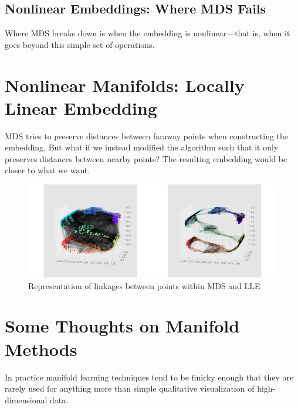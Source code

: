 \subsection{Nonlinear Embeddings: Where MDS Fails}
Where MDS breaks down is when the embedding is nonlinear—that is, when it goes beyond this simple set of operations.

\section{Nonlinear Manifolds: Locally Linear Embedding}
MDS tries to preserve distances between faraway points when constructing the embedding. But what if we instead modified the algorithm such that it
only preserves distances between nearby points? The resulting embedding would be
closer to what we want.

\begin{figure}
    \centering
    \includegraphics[width=\textwidth]{../img/fig46-7.png}
    \caption{Representation of linkages between points within MDS and LLE}
\end{figure}

\section{Some Thoughts on Manifold Methods}
In practice manifold learning techniques tend
to be finicky enough that they are rarely used for anything more than simple qualitative visualization of high-dimensional data.

